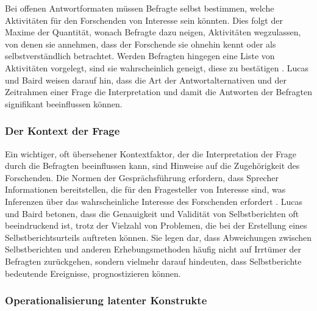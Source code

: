 \documentclass[german,report]{i1thesis}
\begin{document}
Bei offenen Antwortformaten müssen Befragte selbst bestimmen, welche Aktivitäten für den Forschenden von Interesse sein könnten. Dies folgt der Maxime der Quantität, wonach Befragte dazu neigen, Aktivitäten wegzulassen, von denen sie annehmen, dass der Forschende sie ohnehin kennt oder als selbstverständlich betrachtet. Werden Befragten hingegen eine Liste von Aktivitäten vorgelegt, sind sie wahrscheinlich geneigt, diese zu bestätigen \cite{Schwarz1999}. Lucas und Baird \cite{LucasBaird2006} weisen darauf hin, dass die Art der Antwortalternativen und der Zeitrahmen einer Frage die Interpretation und damit die Antworten der Befragten signifikant beeinflussen können.

\subsubsection{Der Kontext der Frage}

Ein wichtiger, oft übersehener Kontextfaktor, der die Interpretation der Frage durch die Befragten beeinflussen kann, sind Hinweise auf die Zugehörigkeit des Forschenden. Die Normen der Gesprächsführung erfordern, dass Sprecher Informationen bereitstellen, die für den Fragesteller von Interesse sind, was Inferenzen über das wahrscheinliche Interesse des Forschenden erfordert \cite{Schwarz1999}. Lucas und Baird \cite{LucasBaird2006} betonen, dass die Genauigkeit und Validität von Selbstberichten oft beeindruckend ist, trotz der Vielzahl von Problemen, die bei der Erstellung eines Selbstberichtsurteils auftreten können. Sie legen dar, dass Abweichungen zwischen Selbstberichten und anderen Erhebungsmethoden häufig nicht auf Irrtümer der Befragten zurückgehen, sondern vielmehr darauf hindeuten, dass Selbstberichte bedeutende Ereignisse, prognostizieren können.

\subsubsection{Operationalisierung latenter Konstrukte}
\end{document}
